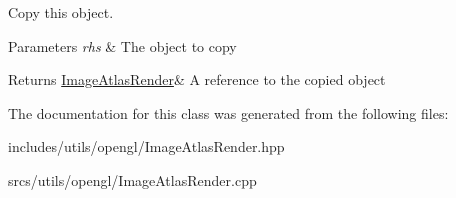 Copy this object. 


\begin{DoxyParams}{Parameters}
{\em rhs} & The object to copy \\
\hline
\end{DoxyParams}
\begin{DoxyReturn}{Returns}
\hyperlink{class_image_atlas_render}{Image\+Atlas\+Render}\& A reference to the copied object 
\end{DoxyReturn}


The documentation for this class was generated from the following files\+:\begin{DoxyCompactItemize}
\item 
includes/utils/opengl/Image\+Atlas\+Render.\+hpp\item 
srcs/utils/opengl/Image\+Atlas\+Render.\+cpp\end{DoxyCompactItemize}

